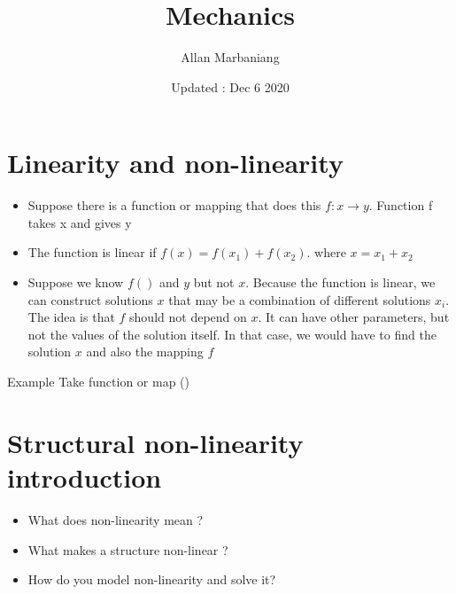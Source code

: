 \title{Mechanics}
\author{Allan Marbaniang}
\date{Updated : Dec 6 2020}
\maketitle
\tableofcontents

\section{Linearity and non-linearity}
	\begin{frame}
		\begin{itemize}
			\item Suppose there is a function or mapping that does this $f : x \rightarrow y$. Function f takes x and gives y
			
			\item The function is linear if $f(x) = f(x_1) + f(x_2)$. where $x = x_1 + x_2$
			
			\item Suppose we know $f()$ and $y$ but not $x$. Because the function is linear, we can construct solutions $x$ that may be a combination of different solutions $x_i$. The idea is that $f$ should not depend on $x$. It can have other parameters, but not the values of the solution itself. In that case, we would have to find the solution $x$ and also the mapping $f$
			
		\end{itemize}
	
		\begin{block}{Example}
			Take function or map () 
		\end{block}
	\end{frame}




\section{Structural non-linearity introduction}
	\begin{frame}
		\begin{itemize}
			\item What does non-linearity mean ?
			\item What makes a structure non-linear ?
			\item How do you model non-linearity and solve it?
		\end{itemize}
	\end{frame}
	
